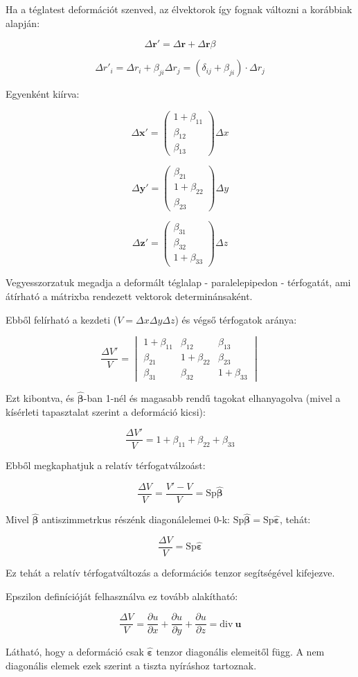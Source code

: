 \documentclass[a4paper, 12pt]{article}
\begin{document}
Ha a téglatest deformációt szenved, az élvektorok így fognak változni a korábbiak alapján:

$$\Delta\mathbf{r'}=\Delta\mathbf{r}+\Delta \mathbf{r} \beta$$

$$\Delta r'_i=\Delta r_i+\beta_{ji}\Delta r_j=(\delta_{ij}+\beta_{ji})\cdot \Delta r_j$$

Egyenként kiírva:

$$\Delta\mathbf{x'}= \left( \begin{array}{c} 1+\beta_{11}\\\beta_{12}\\ \beta_{13}\end{array}\right)\Delta x$$

$$\Delta\mathbf{y'}= \left( \begin{array}{c} \beta_{21}\\1+\beta_{22}\\ \beta_{23}\end{array}\right)\Delta y$$

$$\Delta\mathbf{z'}= \left( \begin{array}{c} \beta_{31}\\\beta_{32}\\ 1+\beta_{33}\end{array}\right)\Delta z$$

Vegyesszorzatuk megadja a deformált téglalap - paralelepipedon - térfogatát, ami átírható a mátrixba rendezett vektorok determinánsaként. 

Ebből felírható a kezdeti ($V=\Delta x\Delta y\Delta z$) és végső térfogatok aránya:

 $$\frac{\Delta V'}{V}=\begin{vmatrix}
1+\beta_{11} & \beta_{12} & \beta_{13} \\ 
\beta_{21} & 1+\beta_{22} & \beta_{23}\\ 
\beta_{31} & \beta_{32} & 1+\beta_{33} 
\end{vmatrix}$$

Ezt kibontva, és $\mathbf{\hat\beta}$-ban 1-nél és magasabb rendű tagokat elhanyagolva (mivel a kísérleti tapasztalat szerint a deformáció kicsi):

$$\frac{\Delta V'}{V}=1+\beta_{11}+\beta_{22}+\beta_{33}$$

Ebből megkaphatjuk a relatív térfogatválzoást:

$$\frac{\Delta V}{V}=\frac{V'-V}{V}=\mathrm{Sp} \mathbf{\hat\beta}$$

Mivel $\mathbf{\hat\beta}$ antiszimmetrkus részénk diagonálelemei 0-k: $\mathrm{Sp} \mathbf{\hat\beta}=\mathrm{Sp} \mathbf{\hat\varepsilon}$, tehát:

$$\frac{\Delta V}{V}=\mathrm{Sp} \mathbf{\hat\varepsilon}$$

Ez tehát a relatív térfogatváltozás a deformációs tenzor segítségével kifejezve.

Epszilon definícióját felhasználva ez tovább alakítható:

$$\frac{\Delta V}{V}=\frac{\partial u}{\partial x}+\frac{\partial u}{\partial y}+\frac{\partial u}{\partial z}=\mathrm{div}~\mathbf{u}$$

Látható, hogy a deformáció csak $\mathbf{\hat\varepsilon}$ tenzor diagonális elemeitől függ. A nem diagonális elemek ezek szerint a tiszta nyíráshoz tartoznak.
\end{document}
